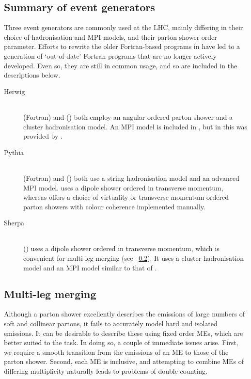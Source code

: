 \subsection{Summary of event generators}
\label{sec:mc:generators}

Three event generators are commonly used at the LHC, mainly differing in their 
choice of hadronisation and MPI models, and their parton shower order parameter. 
Efforts to rewrite the older Fortran-based programs in \cpp have led to a generation of 
`out-of-date' Fortran programs that are no longer actively developed. Even so, they are 
still in common usage, and so are included in the descriptions below.

\begin{description}
\item[Herwig] \hfill \\
	\fherwig (Fortran) \cite{fHerwig} and \herwigpp (\cpp) \cite{Herwig++} both employ an 
	angular ordered parton shower and a cluster hadronisation model. An MPI model is 
	included in \herwigpp, but in \fherwig this was provided by \jimmy \cite{Jimmy}.
\item[Pythia] \hfill \\
	 (Fortran) \cite{Pythia6} and  (\cpp) \cite{Pythia8} both use a 
	string hadronisation model and an advanced MPI model.  uses a dipole 
	shower ordered in transverse momentum, whereas  offers a choice of 
	virtuality or transverse momentum ordered parton showers with colour coherence 
	implemented manually.
\item[Sherpa] \hfill \\
	\sherpa (\cpp) \cite{Sherpa} uses a dipole shower ordered in transverse momentum, 
	which is convenient for multi-leg merging (see \Section~\ref{sec:mc:merging}). It 
	uses a cluster hadronisation model and an MPI model similar to that of .
\end{description}



\subsection{Multi-leg merging}
\label{sec:mc:merging}

Although a parton shower excellently describes the emissions of large numbers of soft and 
collinear partons, it fails to accurately model hard and isolated emissions. It can be 
desirable to describe these using fixed order MEs, which are better suited to the 
task. In doing so, a couple of immediate issues arise. First, we require a smooth 
transition from the emissions of an ME to those of the parton shower. Second, each 
ME is inclusive, and attempting to combine MEs of differing multiplicity 
naturally leads to problems of double counting.

